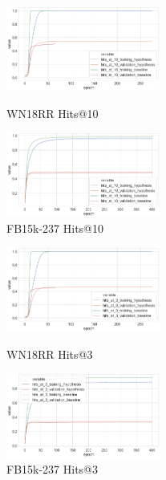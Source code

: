 
\begin{figure}[H]
	\parbox{.5\linewidth}{
   		\centering
    		\includegraphics[width=0.45\textwidth, height=0.2\textheight]{WN18RR_hits_at_10_Results}
		\caption{WN18RR Hits@10}
		}
	\hfill
	\parbox{.5\linewidth}{
   		\centering
		\includegraphics[width=0.45\textwidth, height=0.2\textheight]{FB15k-237_hits_at_10_Results}
		\caption{FB15k-237 Hits@10}
		}
\end{figure}


\begin{figure}[H]
	\parbox{.5\linewidth}{
   		\centering
    		\includegraphics[width=0.45\textwidth, height=0.2\textheight]{WN18RR_hits_at_3_Results}
		\caption{WN18RR Hits@3}
		}
	\hfill
	\parbox{.5\linewidth}{
   		\centering
		\includegraphics[width=0.45\textwidth, height=0.2\textheight]{FB15k-237_hits_at_3_Results}
		\caption{FB15k-237 Hits@3}
		}
\end{figure}


